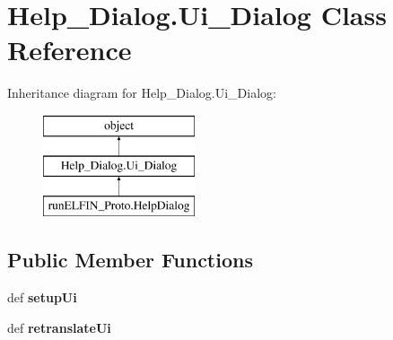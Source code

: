 \hypertarget{classHelp__Dialog_1_1Ui__Dialog}{\section{Help\-\_\-\-Dialog.\-Ui\-\_\-\-Dialog Class Reference}
\label{classHelp__Dialog_1_1Ui__Dialog}
}
Inheritance diagram for Help\-\_\-\-Dialog.\-Ui\-\_\-\-Dialog\-:\begin{figure}[H]
\begin{center}
\leavevmode
\includegraphics[height=3.000000cm]{classHelp__Dialog_1_1Ui__Dialog}
\end{center}
\end{figure}
\subsection*{Public Member Functions}
\begin{DoxyCompactItemize}
\item 
\hypertarget{classHelp__Dialog_1_1Ui__Dialog_af5886b2e0ede899c371ef0326bffa1ab}{def {\bfseries setup\-Ui}}\label{classHelp__Dialog_1_1Ui__Dialog_af5886b2e0ede899c371ef0326bffa1ab}

\item 
\hypertarget{classHelp__Dialog_1_1Ui__Dialog_a260cc059168a2f6e9e3d452c14d9b592}{def {\bfseries retranslate\-Ui}}\label{classHelp__Dialog_1_1Ui__Dialog_a260cc059168a2f6e9e3d452c14d9b592}

\end{DoxyCompactItemize}
